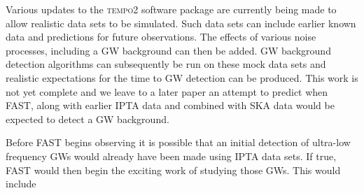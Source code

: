 \documentclass{raa}            %
\begin{document}
Various updates to the \textsc{tempo2} software package \citep{hem06} are currently being made to allow realistic data sets to be simulated.  Such data sets can include earlier known data and predictions for future observations. The effects of various noise processes, including a GW background can then be added. GW background detection algorithms can subsequently be run on these mock data sets and realistic expectations for the time to GW detection can be produced.  This work is not yet complete and we leave to a later paper an attempt to predict when FAST, along with earlier IPTA data and combined with SKA data would be expected to detect a GW background. 

Before FAST begins observing it is possible that an initial detection of ultra-low frequency GWs would already have been made using IPTA data sets. If true, FAST would then begin the exciting work of studying those GWs.  This would include
\end{document}
